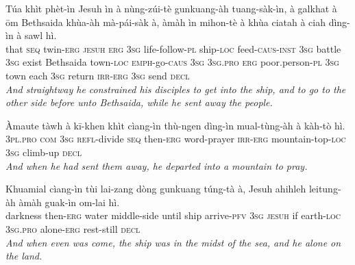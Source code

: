 \documentclass[11pt,a4paper]{article}
\begin{document}
\begin{exe}
\gll Túa khìt phèt-ìn Jesuh ìn à nùng-zúi-tè gunkuang-àh tuang-sàk-ìn, à galkhat à ōm Bethsaida khùa-àh mà-pái-sàk à, àmàh ìn mihon-tè à khùa ciatah à ciah dìng-ìn à sawl hì. \\
     that \textsc{seq} twin-\textsc{erg} \textsc{jesuh} \textsc{erg} \textsc{3sg} life-follow-\textsc{pl} ship-\textsc{loc} feed-\textsc{caus}-\textsc{inst} \textsc{3sg} battle \textsc{3sg} exist Bethsaida town-\textsc{loc} \textsc{emph}-go-\textsc{caus} \textsc{3sg} \textsc{3sg}.\textsc{pro} \textsc{erg} poor.person-\textsc{pl} \textsc{3sg} town each \textsc{3sg} return \textsc{irr}-\textsc{erg} \textsc{3sg} send \textsc{decl} \\
\glt \textcolor{kjvcolor}{\textit{And straightway he constrained his disciples to get into the ship, and to go to the other side before unto Bethsaida, while he sent away the people.}}

\gll Àmaute tàwh à kī-khen khìt cìang-ìn thù-ngen dìng-ìn mual-tùng-àh à kàh-tò hì. \\
     \textsc{3pl}.\textsc{pro} \textsc{com} \textsc{3sg} \textsc{refl}-divide \textsc{seq} then-\textsc{erg} word-prayer \textsc{irr}-\textsc{erg} mountain-top-\textsc{loc} \textsc{3sg} climb-up \textsc{decl} \\
\glt \textcolor{kjvcolor}{\textit{And when he had sent them away, he departed into a mountain to pray.}}

\gll Khuamial cìang-ìn tùi lai-zang dòng gunkuang túng-tà à, Jesuh ahihleh leitung-àh àmàh guak-ìn om-lai hì. \\
     darkness then-\textsc{erg} water middle-side until ship arrive-\textsc{pfv} \textsc{3sg} \textsc{jesuh} if earth-\textsc{loc} \textsc{3sg}.\textsc{pro} alone-\textsc{erg} rest-still \textsc{decl} \\
\glt \textcolor{kjvcolor}{\textit{And when even was come, the ship was in the midst of the sea, and he alone on the land.}}


\end{exe}
\end{document}
